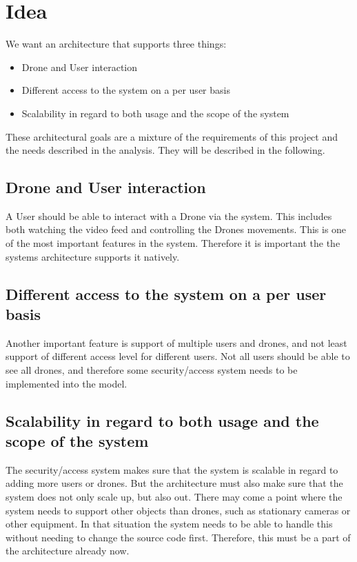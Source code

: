 

\section{Idea}
We want an architecture that supports three things:

\begin{itemize}
	\item Drone and User interaction
	\item Different access to the system on a per user basis 
	\item Scalability in regard to both usage and the scope of the system
\end{itemize}

These architectural goals are a mixture of the requirements of this project and the needs described in the analysis. 
They will be described in the following. 


\subsection{Drone and User interaction}
A User should be able to interact with a Drone via the system.
This includes both watching the video feed and controlling the Drones movements.
This is one of the most important features in the system.
Therefore it is important the the systems architecture supports it natively. 


\subsection{Different access to the system on a per user basis}
Another important feature is support of multiple users and drones, and not least support of different access level for different users.
Not all users should be able to see all drones, and therefore some security/access system needs to be implemented into the model. 


\subsection{Scalability in regard to both usage and the scope of the system}
The security/access system makes sure that the system is scalable in regard to adding more users or drones. 
But the architecture must also make sure that the system does not only scale up, but also out. 
There may come a point where the system needs to support other objects than drones, such as stationary cameras or other equipment. 
In that situation the system needs to be able to handle this without needing to change the source code first.
Therefore, this must be a part of the architecture already now. 


